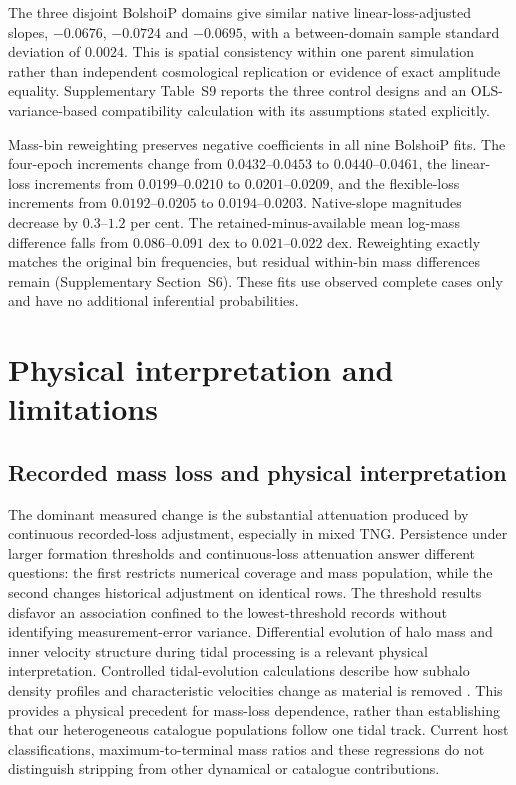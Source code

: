 \documentclass[11pt,a4paper]{article}
\begin{document}
The three disjoint BolshoiP domains give similar native linear-loss-adjusted slopes, $-0.0676$, $-0.0724$ and $-0.0695$, with a between-domain sample standard deviation of $0.0024$. This is spatial consistency within one parent simulation rather than independent cosmological replication or evidence of exact amplitude equality. Supplementary Table~S9 reports the three control designs and an OLS-variance-based compatibility calculation with its assumptions stated explicitly.

Mass-bin reweighting preserves negative coefficients in all nine BolshoiP fits. The four-epoch increments change from $0.0432$--$0.0453$ to $0.0440$--$0.0461$, the linear-loss increments from $0.0199$--$0.0210$ to $0.0201$--$0.0209$, and the flexible-loss increments from $0.0192$--$0.0205$ to $0.0194$--$0.0203$. Native-slope magnitudes decrease by $0.3$--$1.2$ per cent. The retained-minus-available mean log-mass difference falls from $0.086$--$0.091$ dex to $0.021$--$0.022$ dex. Reweighting exactly matches the original bin frequencies, but residual within-bin mass differences remain (Supplementary Section~S6). These fits use observed complete cases only and have no additional inferential probabilities.

\section{Physical interpretation and limitations}
\subsection{Recorded mass loss and physical interpretation}
The dominant measured change is the substantial attenuation produced by continuous recorded-loss adjustment, especially in mixed TNG. Persistence under larger formation thresholds and continuous-loss attenuation answer different questions: the first restricts numerical coverage and mass population, while the second changes historical adjustment on identical rows. The threshold results disfavor an association confined to the lowest-threshold records without identifying measurement-error variance. Differential evolution of halo mass and inner velocity structure during tidal processing is a relevant physical interpretation. Controlled tidal-evolution calculations describe how subhalo density profiles and characteristic velocities change as material is removed \citep{Penarrubia2008,Errani2021,Benson2022}. This provides a physical precedent for mass-loss dependence, rather than establishing that our heterogeneous catalogue populations follow one tidal track. Current host classifications, maximum-to-terminal mass ratios and these regressions do not distinguish stripping from other dynamical or catalogue contributions.
\end{document}
